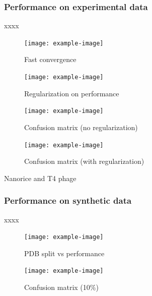 \subsubsection{Performance on experimental data}

xxxx

\begin{figure}
\centering
\texttt{[image: example-image]}
\caption{Fast convergence}
\label{fig:fast_convergence}
\end{figure}

\begin{figure}
\texttt{[image: example-image]}
\caption{Regularization on performance}
\label{fig:regularization_on_performance}
\end{figure}


\begin{figure}
\texttt{[image: example-image]}
\caption{Confusion matrix (no regularization)}
\label{fig:confusion_matrix_no_reg}
\end{figure}

\begin{figure}
\texttt{[image: example-image]}
\caption{Confusion matrix (with regularization)}
\label{fig:confusion_matrix_with_reg}
\end{figure}

Nanorice and T4 phage

\subsubsection{Performance on synthetic data}

xxxx

\begin{figure}
\texttt{[image: example-image]}
\caption{PDB split vs performance}
\label{fig:confusion_matrix_with_reg}
\end{figure}

\begin{figure}
\texttt{[image: example-image]}
\caption{Confusion matrix (10\%)}
\label{fig:confusion_matrix_with_reg}
\end{figure}


